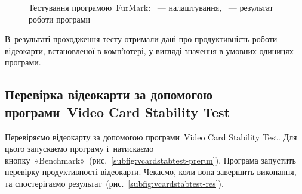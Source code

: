 \documentclass[
	a4paper,
	oneside,
	BCOR = 10mm,
	DIV = 12,
	12pt,
	headings = normal,
]{scrartcl}
\begin{document}
\begin{figure}[!htbp]
\begin{subfigure}[t]{\columnwidth / 2}
					\caption{}
					\label{subfig:furmark-res}
				\end{subfigure}%
				\caption{Тестування програмою~\textenglish{FurMark}: ~— налаштування, ~— результат роботи програми}
				\label{fig:furmark}
			\end{figure}

			В~результаті проходження тесту отримали дані про продуктивність роботи відеокарти, встановленої в комп'ютері, у вигляді значення в умовних одиницях програми. 

		\subsection{Перевірка відеокарти за допомогою програми~\textenglish{Video Card Stability Test}}
			Перевіряємо відеокарту за допомогою програми~\textenglish{Video Card Stability Test}. Для цього запускаємо програму і~натискаємо кнопку~«\textenglish{Benchmark}»~(рис.~\ref{subfig:vcardstabtest-prerun}). Програма запустить перевірку продуктивності відеокарти. Чекаємо, коли вона завершить виконання, та спостерігаємо результат~(рис.~\ref{subfig:vcardstabtest-res}).
\end{document}
